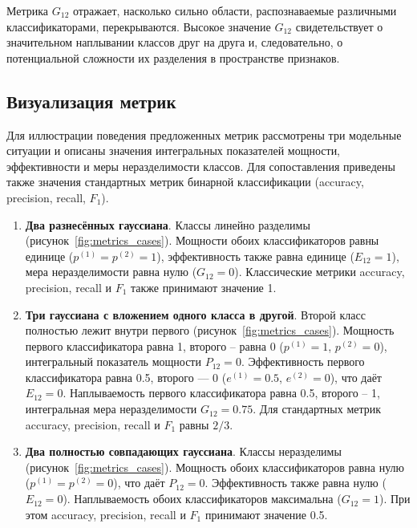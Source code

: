 Метрика \(G_{12}\) отражает, насколько сильно области, распознаваемые различными классификаторами, перекрываются. Высокое значение \(G_{12}\) свидетельствует о значительном наплывании классов друг на друга и, следовательно, о потенциальной сложности их разделения в пространстве признаков.


\subsection{Визуализация метрик}

Для иллюстрации поведения предложенных метрик рассмотрены три модельные ситуации и описаны значения интегральных показателей мощности, эффективности и меры неразделимости классов. Для сопоставления приведены также значения стандартных метрик бинарной классификации (accuracy, precision, recall, \(F_1\)).  

\begin{enumerate}
    \item \textbf{Два разнесённых гауссиана}. Классы линейно разделимы (рисунок~\cref{fig:metrics_cases}). Мощности обоих классификаторов равны единице (\(p^{(1)}=p^{(2)}= 1\)), эффективность также равна единице (\(E_{12} = 1\)), мера неразделимости равна нулю (\(G_{12} = 0\)). Классические метрики accuracy, precision, recall и \(F_1\) также принимают значение 1.  

    \item \textbf{Три гауссиана с вложением одного класса в другой}. Второй класс полностью лежит внутри первого (рисунок~\cref{fig:metrics_cases}). Мощность первого классификатора равна 1, второго -- равна 0 (\(p^{(1)} = 1\), \(p^{(2)}=0\)), интегральный показатель мощности \(P_{12} = 0\). Эффективность первого классификатора равна 0.5, второго — 0 (\(e^{(1)} = 0.5\), \(e^{(2)} = 0\)), что даёт \(E_{12}=0\). Наплываемость первого классификатора равна 0.5, второго -- 1, интегральная мера неразделимости \(G_{12} = 0.75\). Для стандартных метрик accuracy, precision, recall и \(F_1\) равны \(2/3\).  

    \item \textbf{Два полностью совпадающих гауссиана}. Классы неразделимы (рисунок~\cref{fig:metrics_cases}). Мощность обоих классификаторов равна нулю (\(p^{(1)} = p^{(2)} = 0\)), что даёт \(P_{12} = 0\). Эффективность также равна нулю (\(E_{12}=0\)). Наплываемость обоих классификаторов максимальна (\(G_{12} = 1\)). При этом accuracy, precision, recall и \(F_1\) принимают значение 0.5.
\end{enumerate}

